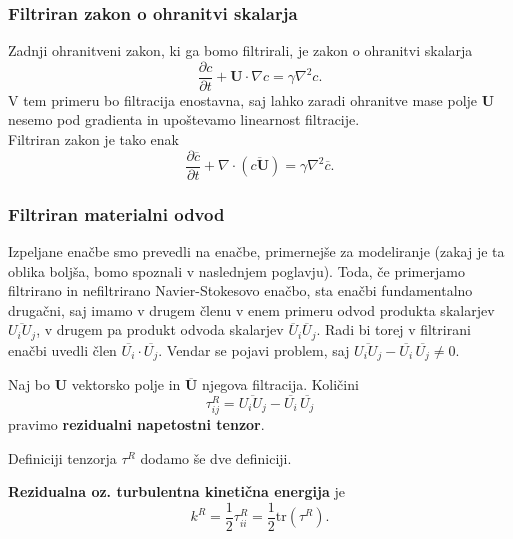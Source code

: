 \documentclass[mat2, tisk]{fmfdelo}
\newcommand{\bd}{\textbf}
\begin{document}
\subsubsection{Filtriran zakon o ohranitvi skalarja}

Zadnji ohranitveni zakon, ki ga bomo filtrirali, je zakon o ohranitvi skalarja
$$
\frac{\partial c}{\partial t} + \bd{U}\cdot\nabla c = \gamma \nabla^2 c.
$$
V tem primeru bo filtracija enostavna, saj lahko zaradi ohranitve mase polje $\bd{U}$ 
nesemo pod gradienta in upoštevamo linearnost filtracije. \\
Filtriran zakon je tako enak
\begin{equation*}
\frac{\partial \overline{c}}{\partial t} + \nabla \cdot (\overline{c\bd{U}}) = \gamma \nabla^2 \overline{c}.
\end{equation*}

\subsubsection{Filtriran materialni odvod}

Izpeljane enačbe smo prevedli na enačbe, primernejše za modeliranje (zakaj je ta oblika boljša, bomo spoznali v naslednjem poglavju). Toda, če primerjamo filtrirano in 
nefiltrirano Navier-Stokesovo enačbo, sta enačbi fundamentalno drugačni, saj imamo 
v drugem členu v enem primeru odvod produkta skalarjev $\overline{U_i U_j}$, v drugem pa produkt odvoda
skalarjev $\overline{U}_i \overline{U}_j$. Radi bi torej v filtrirani enačbi uvedli člen $\overline{U_i} \cdot \overline{U_j}$.
Vendar se pojavi problem, saj $\overline{U_i U_j}-\overline{U_i}\,\overline{U_j} \neq 0$. 
\begin{definicija}
Naj bo $\bd{U}$ vektorsko polje in $\overline{\bd{U}}$ njegova filtracija. Količini 
\begin{equation*}
\tau_{ij}^R = \overline{U_i U_j} - \overline{U_i} \,\overline{U_j}
\end{equation*}
pravimo \textbf{rezidualni napetostni tenzor}.
\end{definicija}

Definiciji tenzorja $\tau^R$ dodamo še dve definiciji.
\begin{definicija}
\bd{Rezidualna oz. turbulentna kinetična energija} je 
\begin{equation*}
k^R = \frac{1}{2} \tau_{ii}^R = \frac{1}{2}\text{tr}(\tau^R).
\end{equation*}
\end{definicija}
\end{document}
